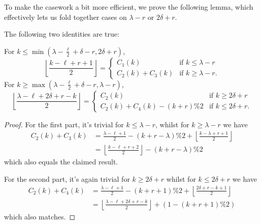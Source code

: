 To make the casework a bit more efficient, we prove the following lemma,
which effectively lets us fold together cases on $\lambda-r$ or $2\delta+r$.
\begin{lemma}
  \label{lem:folding_cases}
  The following two identities are true:
  \begin{itemize}
  \ii For $k \le \min\left( \lambda - \frac{\ell}{2} + \delta - r, 2 \delta + r \right)$,
  \[
    \left\lfloor \frac{k - \ell + r + 1}{2} \right\rfloor
    = \begin{cases}
      C_1(k) & \text{if } k \le \lambda - r \\
      C_2(k) + C_3(k) & \text{if } k \ge \lambda-r.
    \end{cases}
  \]
  \ii For $k \ge \max\left( \lambda - \frac{\ell}{2} + \delta - r, \lambda - r \right)$,
  \[
    \left\lfloor \frac{\lambda-\ell+2\delta+r-k}{2} \right\rfloor
    = \begin{cases}
      C_2(k) &\text{if } k \ge 2\delta + r \\
      C_2(k)+C_4(k)-(k+r)\%2 & \text{if }k \le 2 \delta + r.
    \end{cases}
  \]
  \end{itemize}
\end{lemma}
\begin{proof}
  For the first part,
  it's trivial for $k \le \lambda-r$, whilst for $k \ge \lambda-r$ we have
  \begin{align*}
    C_2(k) + C_3(k) &=
      \frac{\lambda-\ell+1}{2} - (k+r-\lambda) \% 2
      + \left\lfloor \frac{k-\lambda+r+1}{2} \right\rfloor \\
      &= \left\lfloor \frac{k-\ell+r+2}{2} \right\rfloor - (k+r-\lambda) \% 2
  \end{align*}
  which also equals the claimed result.

  For the second part,
  it's again trivial for $k \ge 2\delta + r$ whilst for $k \le 2\delta + r$ we have
  \begin{align*}
    C_2(k) + C_4(k) &=
    \frac{\lambda-\ell+1}{2} - (k+r+1)\%2 + \left\lfloor \frac{2\delta+r-k+1}{2} \right\rfloor \\
    &= \left\lfloor \frac{\lambda-\ell+2\delta+r-k}{2} \right\rfloor
    + (1 - (k+r+1)\%2)
  \end{align*}
  which also matches.
\end{proof}

